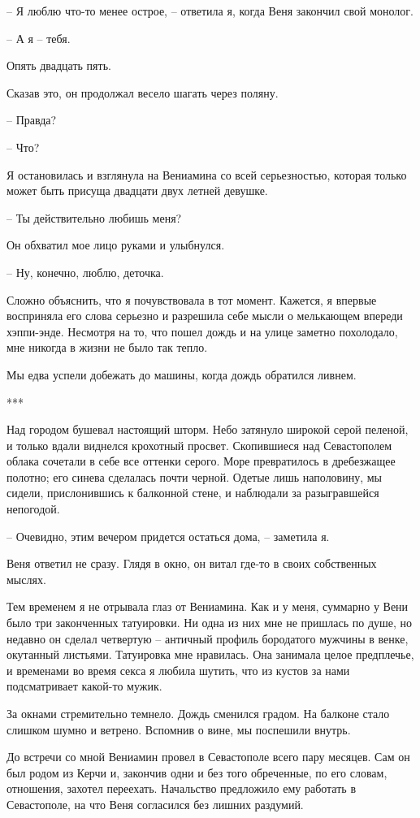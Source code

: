 \documentclass[
]{book}
\begin{document}
-- Я люблю что-то менее острое, -- ответила я, когда Веня закончил свой монолог.

-- А я -- тебя.

Опять двадцать пять.

Сказав это, он продолжал весело шагать через поляну.

-- Правда?

-- Что?

Я остановилась и взглянула на Вениамина со всей серьезностью, которая только может быть присуща двадцати двух летней девушке.

-- Ты действительно любишь меня?

Он обхватил мое лицо руками и улыбнулся.

-- Ну, конечно, люблю, деточка.

Сложно объяснить, что я почувствовала в тот момент. Кажется, я впервые восприняла его слова серьезно и разрешила себе мысли о мелькающем впереди хэппи-энде. Несмотря на то, что пошел дождь и на улице заметно похолодало, мне никогда в жизни не было так тепло.

Мы едва успели добежать до машины, когда дождь обратился ливнем.

***

Над городом бушевал настоящий шторм. Небо затянуло широкой серой пеленой, и только вдали виднелся крохотный просвет. Скопившиеся над Севастополем облака сочетали в себе все оттенки серого. Море превратилось в дребезжащее полотно; его синева сделалась почти черной. Одетые лишь наполовину, мы сидели, прислонившись к балконной стене, и наблюдали за разыгравшейся непогодой.

-- Очевидно, этим вечером придется остаться дома, -- заметила я.

Веня ответил не сразу. Глядя в окно, он витал где-то в своих собственных мыслях.

Тем временем я не отрывала глаз от Вениамина. Как и у меня, суммарно у Вени было три законченных татуировки. Ни одна из них мне не пришлась по душе, но недавно он сделал четвертую -- античный профиль бородатого мужчины в венке, окутанный листьями. Татуировка мне нравилась. Она занимала целое предплечье, и временами во время секса я любила шутить, что из кустов за нами подсматривает какой-то мужик.

За окнами стремительно темнело. Дождь сменился градом. На балконе стало слишком шумно и ветрено. Вспомнив о вине, мы поспешили внутрь.

До встречи со мной Вениамин провел в Севастополе всего пару месяцев. Сам он был родом из Керчи и, закончив одни и без того обреченные, по его словам, отношения, захотел переехать. Начальство предложило ему работать в Севастополе, на что Веня согласился без лишних раздумий.
\end{document}
